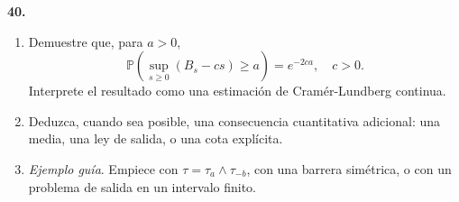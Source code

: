 \documentclass[11pt, letterpaper]{article}
\begin{document}
\newpage

\begin{ejercicio}
    \textbf{40.} 
    \begin{enumerate}
        \item Demuestre que, para $a > 0$,
        \[ \mathbb{P}\left(\sup_{s \ge 0}(B_s - cs) \ge a\right) = e^{-2ca}, \quad c > 0. \]
        Interprete el resultado como una estimación de Cramér-Lundberg continua.
        \item Deduzca, cuando sea posible, una consecuencia cuantitativa adicional: una media, una ley de salida, o una cota explícita.
        \item \textit{Ejemplo guía}. Empiece con $\tau = \tau_a \wedge \tau_{-b}$, con una barrera simétrica, o con un problema de salida en un intervalo finito.
    \end{enumerate}
\end{ejercicio}

\vspace{5mm}
\end{document}
